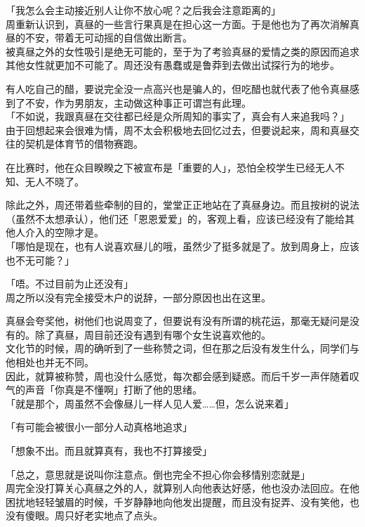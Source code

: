 「我怎么会主动接近别人让你不放心呢？之后我会注意距离的」\\

周重新认识到，真昼的一些言行果真是在担心这一方面。于是他也为了再次消解真昼的不安，带着无可动摇的自信做出断言。\\

被真昼之外的女性吸引是绝无可能的，至于为了考验真昼的爱情之类的原因而追求其他女性就更加不可能了。周还没有愚蠢或是鲁莽到去做出试探行为的地步。

有人吃自己的醋，要说完全没一点高兴也是骗人的，但吃醋也就代表了他令真昼感到了不安，作为男朋友，主动做这种事正可谓岂有此理。\\

「不如说，我跟真昼在交往都已经是众所周知的事实了，真会有人来追我吗？」\\

由于回想起来会很难为情，周不太会积极地去回忆过去，但要说起来，周和真昼交往的契机是体育节的借物赛跑。

在比赛时，他在众目睽睽之下被宣布是「重要的人」，恐怕全校学生已经无人不知、无人不晓了。

除此之外，周还带着些牵制的目的，堂堂正正地站在了真昼身边。而且按树的说法（虽然不太想承认），他们还「恩恩爱爱」的，客观上看，应该已经没有了能给其他人介入的空隙才是。\\

「哪怕是现在，也有人说喜欢昼儿的哦，虽然少了挺多就是了。放到周身上，应该也不无可能？」

「唔。不过目前为止还没有」\\

周之所以没有完全接受木户的说辞，一部分原因也出在这里。

真昼会夸奖他，树他们也说周变了，但要说有没有所谓的桃花运，那毫无疑问是没有的。除了真昼，周目前还没有遇到有哪个女生说喜欢他的。\\

文化节的时候，周的确听到了一些称赞之词，但在那之后没有发生什么，同学们与他相处也并无不同。\\

因此，就算被称赞，周也没什么感觉，每次都会感到疑惑。而后千岁一声伴随着叹气的声音「你真是不懂啊」打断了他的思绪。\\

「就是那个，周虽然不会像昼儿一样人见人爱……但，怎么说来着」

「有可能会被很小一部分人动真格地追求」

「想象不出。而且就算真有，我也不打算接受」

「总之，意思就是说叫你注意点。倒也完全不担心你会移情别恋就是」\\

周完全没打算关心真昼之外的人，就算别人向他表达好感，他也没办法回应。在他困扰地轻轻皱眉的时候，千岁静静地向他发出提醒，而且没有捉弄、没有笑他，也没有傻眼。周只好老实地点了点头。
